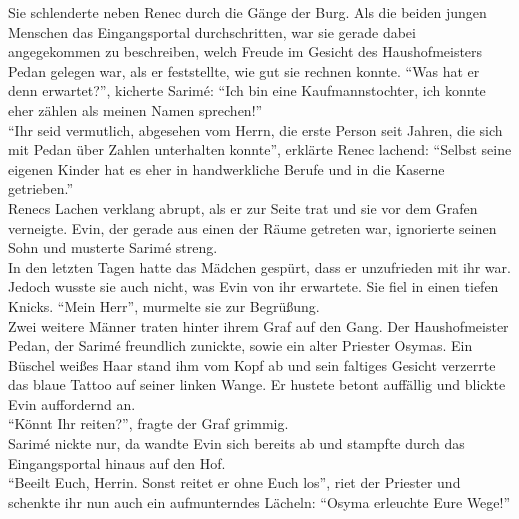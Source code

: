 Sie schlenderte neben Renec durch die Gänge der Burg. Als die beiden jungen Menschen das 
Eingangsportal durchschritten, war sie gerade dabei angegekommen zu beschreiben, welch Freude im 
Gesicht des Haushofmeisters Pedan gelegen war, als er feststellte, wie gut sie rechnen konnte. ``Was 
hat er denn erwartet?'', kicherte Sarimé: ``Ich bin eine Kaufmannstochter, ich konnte eher zählen 
als meinen Namen sprechen!''\\
``Ihr seid vermutlich, abgesehen vom Herrn, die erste Person seit Jahren, die sich mit Pedan über 
Zahlen unterhalten konnte'', erklärte Renec lachend: ``Selbst seine eigenen Kinder hat es eher in 
handwerkliche Berufe und in die Kaserne getrieben.''\\
Renecs Lachen verklang abrupt, als er zur Seite trat und sie vor dem Grafen verneigte. Evin, der 
gerade aus einen der Räume getreten war, ignorierte seinen Sohn und musterte Sarimé streng.\\
In den letzten Tagen hatte das Mädchen gespürt, dass er unzufrieden mit ihr war. Jedoch wusste sie 
auch nicht, was Evin von ihr erwartete. Sie fiel in einen tiefen Knicks. ``Mein Herr'', murmelte 
sie zur Begrüßung.\\
Zwei weitere Männer traten hinter ihrem Graf auf den Gang. Der Haushofmeister Pedan, der Sarimé 
freundlich zunickte, sowie ein alter Priester Osymas. Ein Büschel weißes Haar stand ihm vom Kopf ab 
und sein faltiges Gesicht verzerrte das blaue Tattoo auf seiner linken Wange. Er hustete betont 
auffällig und blickte Evin auffordernd an.\\
``Könnt Ihr reiten?'', fragte der Graf grimmig.\\
Sarimé nickte nur, da wandte Evin sich bereits ab und stampfte durch das Eingangsportal hinaus auf 
den Hof.\\
``Beeilt Euch, Herrin. Sonst reitet er ohne Euch los'', riet der Priester und schenkte ihr nun auch 
ein aufmunterndes Lächeln: ``Osyma erleuchte Eure Wege!''\\


